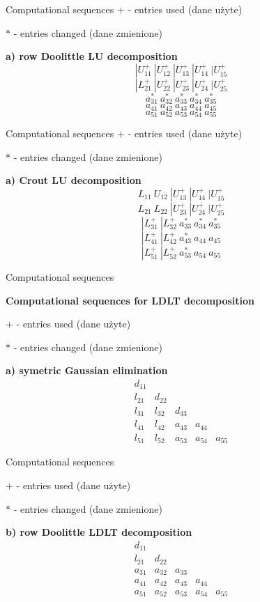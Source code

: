 \begin{frame}{Computational sequences}
$+$ - entries used (dane użyte)

$*$ - entries changed (dane zmienione)


\textbf{a) row Doolittle LU decomposition}
$$
|U_{11}^{+}\ |U_{12}^{+}\ |U_{13}^{+}\ |U_{14}^{+}\ |U_{15}^{+}
$$
$$
|L_{21}^{+}\ |U_{22}^{+}\ |U_{23}^{+}\ |U_{24}^{+}\ |U_{25}^{+} 
$$
$$
a_{31}^{*}\ a_{32}^{*}\ a_{33}^{*}\ a_{34}^{*}\ a_{35}^{*}
$$
$$
a_{41}\ a_{42}\ a_{43}\ a_{44}\ a_{45} 
$$
$$
a_{51}\ a_{52}\ a_{53}\  a_{54}\ a_{55}
$$

\end{frame}
\begin{frame}{Computational sequences}
$+$ - entries used (dane użyte)

$*$ - entries changed (dane zmienione)


\textbf{a) Crout LU decomposition}
$$
L_{11}\ U_{12}\ |U_{13}^{+}\ |U_{14}^{+}\ |U_{15}^{+} 
$$
$$
L_{21}\ L_{22}\ |U_{23}^{+}\ |U_{24}^{+}\ |U_{25}^{+} 
$$
$$
|L_{31}^{+}\ |L_{32}^{+}\ a_{33}^{*}\ a_{34}^{*}\ a_{35}^{*}
$$
$$
|L_{41}^{+}\ |L_{42}^{+}\ a_{43}^{*}\ a_{44}\ a_{45}
$$
$$
|L_{51}^{+}\ |L_{52}^{+}\ a_{53}^{*}\ a_{54}\ a_{55}
$$

\end{frame}
\begin{frame}{Computational sequences}

\textbf{Computational sequences for LDLT decomposition}

$+$ - entries used (dane użyte)

$*$ - entries changed (dane zmienione)

\textbf{a) symetric Gaussian elimination}
$$
\begin{array}{lllll}

d_{11} \\
l_{21} & d_{22}\\
l_{31} & l_{32} & d_{33}\\
l_{41} & l_{42} & a_{43} & a_{44}\\
l_{51} & l_{52} & a_{53} & a_{54} & a_{55}

\end{array}
$$

\end{frame}
\begin{frame}{Computational sequences}

$+$ - entries used (dane użyte)

$*$ - entries changed (dane zmienione)

\textbf{b) row Doolittle LDLT decomposition}
$$
\begin{array}{lllll}
d_{11} \\
l_{21} & d_{22} \\
a_{31} & a_{32} & a_{33}\\
a_{41} & a_{42} & a_{43} & a_{44} \\
a_{51} & a_{52} & a_{53} & a_{54} & a_{55}
\end{array}
$$

\end{frame} 
